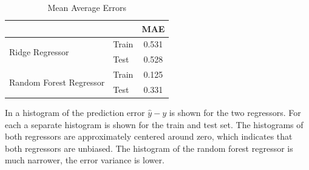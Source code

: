 \documentclass[12pt,a4paper]{scrartcl}
\begin{document}
	\begin{table}[H]
		\centering
		\begin{tabular}{ll|c|}
			\cline{3-3}
			&       & MAE   \\ \hline
			\multicolumn{1}{|l|}{\multirow{2}{*}{Ridge Regressor}}         & Train & 0.531 \\ \cline{2-3} 
			\multicolumn{1}{|l|}{}                                         & Test  & 0.528 \\ \hline
			\multicolumn{1}{|l|}{\multirow{2}{*}{Random Forest Regressor}} & Train & 0.125 \\ \cline{2-3} 
			\multicolumn{1}{|l|}{}                                         & Test  & 0.331 \\ \hline
		\end{tabular}
		\caption{Mean Average Errors}
		\label{tab:ex1_3_mae}
	\end{table}
	
	In  a histogram of the prediction error $\hat{y}-y$ is shown for 
	the two regressors. For each a separate histogram is shown for the train and test set.
	The histograms of both regressors are approximately centered around zero, which indicates that both regressors are unbiased.
	The histogram of the random forest regressor is much narrower, the error variance is lower.
	
\end{document}
